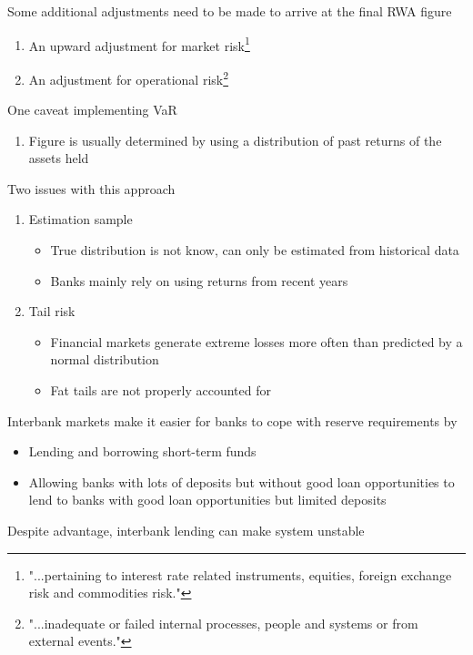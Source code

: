 \documentclass{beamer}
\begin{document}
\begin{frame}
  Some additional adjustments need to be made to arrive at the final RWA figure
\begin{enumerate}
  \item An upward adjustment for market risk\footnote{"...pertaining to interest rate related instruments, equities, foreign exchange risk and commodities risk."}
  \item An adjustment for operational risk\footnote{"...inadequate or failed internal processes, people and systems or from external events."} 
\end{enumerate}

\end{frame}

\begin{frame}
 One caveat implementing VaR
 \begin{enumerate}
   \item Figure is usually determined by using a distribution of past returns of the assets held
 \end{enumerate}
 \medskip
 Two issues with this approach
\begin{enumerate}
  \item Estimation sample
  \begin{itemize}
    \item True distribution is not know, can only be estimated from historical data
    \item Banks mainly rely on using returns from recent years
  \end{itemize}
  \medskip
  \item Tail risk
  \begin{itemize}
    \item Financial markets generate extreme losses more often than predicted by a normal distribution
    \item Fat tails are not properly accounted for
  \end{itemize}
\end{enumerate}
\end{frame}

\begin{frame}
  Interbank markets make it easier for banks to cope with reserve requirements by
\begin{itemize}
  \item Lending and borrowing short-term funds
  \item Allowing banks with lots of deposits but without good loan opportunities to lend to banks with good loan opportunities but limited deposits
\end{itemize}
\medskip
Despite advantage, interbank lending can make system unstable
\end{frame}
\end{document}
